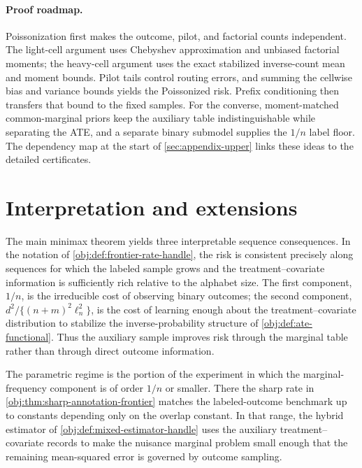 \documentclass[11pt]{article}
\begin{document}
\paragraph{Proof roadmap.}
Poissonization first makes the outcome, pilot, and factorial counts independent. The light-cell argument uses Chebyshev approximation and unbiased factorial moments; the heavy-cell argument uses the exact stabilized inverse-count mean and moment bounds. Pilot tails control routing errors, and summing the cellwise bias and variance bounds yields the Poissonized risk. Prefix conditioning then transfers that bound to the fixed samples. For the converse, moment-matched common-marginal priors keep the auxiliary table indistinguishable while separating the ATE, and a separate binary submodel supplies the \(1/n\) label floor. The dependency map at the start of \cref{sec:appendix-upper} links these ideas to the detailed certificates.


\section{Interpretation and extensions}\label{sec:interpretation}

The main minimax theorem yields three interpretable sequence consequences. In the notation of \cref{obj:def:frontier-rate-handle}, the risk is consistent precisely along sequences for which the labeled sample grows and the treatment--covariate information is sufficiently rich relative to the alphabet size. The first component, \(1/n\), is the irreducible cost of observing binary outcomes; the second component, \(d^2/\{(n+m)^2\ell_n^2\}\), is the cost of learning enough about the treatment--covariate distribution to stabilize the inverse-probability structure of \cref{obj:def:ate-functional}. Thus the auxiliary sample improves risk through the marginal table rather than through direct outcome information.

The parametric regime is the portion of the experiment in which the marginal-frequency component is of order \(1/n\) or smaller. There the sharp rate in \cref{obj:thm:sharp-annotation-frontier} matches the labeled-outcome benchmark up to constants depending only on the overlap constant. In that range, the hybrid estimator of \cref{obj:def:mixed-estimator-handle} uses the auxiliary treatment--covariate records to make the nuisance marginal problem small enough that the remaining mean-squared error is governed by outcome sampling.
\end{document}

